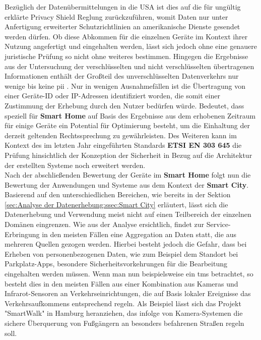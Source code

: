 Bezüglich der Datenübermittelungen in die USA ist dies auf die für ungültig erklärte Privacy Shield Reglung \cite{dsgvo2016} zurückzuführen, womit Daten nur unter Anfertigung erweiterter Schutzrichtlinien an amerikanische Dienste gesendet werden dürfen. Ob diese Abkommen für die einzelnen Geräte im Kontext ihrer Nutzung angefertigt und eingehalten werden, lässt sich jedoch ohne eine genauere juristische Prüfung so nicht ohne weiteres bestimmen. Hingegen die Ergebnisse aus der Untersuchung der verschlüsselten und nicht verschlüsselten übertragenen Informationen enthält der Großteil des unverschlüsselten Datenverkehrs nur wenige bis keine \ac{pii} \cite{Ren2019}. Nur in wenigen Ausnahmefällen ist die Übertragung von einer Geräte-ID oder IP-Adressen identifiziert worden, die somit einer Zustimmung der Erhebung durch den Nutzer bedürfen würde.
Bedeutet, dass speziell für \textbf{Smart Home} auf Basis des Ergebnisse aus dem erhobenen Zeitraum für einige Geräte ein Potential für Optimierung besteht, um die Einhaltung der derzeit geltenden Rechtssprechung zu gewährleisten. 
Des Weiteren kann im Kontext des im letzten Jahr eingeführten Standards \textbf{ETSI EN 303 645} \cite{Cyber2020} die Prüfung hinsichtlich der Konzeption der Sicherheit in Bezug auf die Architektur der erstellten Systeme noch erweitert werden.\\
Nach der abschließenden Bewertung der Geräte im \textbf{Smart Home} folgt nun die Bewertung der Anwendungen und Systeme aus dem Kontext der \textbf{Smart City}. Basierend auf den unterschiedlichen Bereichen, wie bereits in der Sektion \ref{sec:Analyse der Datenerhebung:ssec:Smart City} erläutert, lässt sich die Datenerhebung und Verwendung meist nicht auf einen Teilbereich der einzelnen Domänen eingrenzen.
Wie aus der Analyse \cite{BCG2020} ersichtlich, findet zur Service-Erbringung in den meisten Fällen eine Aggregation an Daten statt, die aus mehreren Quellen gezogen werden. Hierbei besteht jedoch die Gefahr, dass bei Erheben von personenbezogenen Daten, wie zum Beispiel dem Standort bei Parkplatz-Apps, besondere Sicherheitsvorkehrungen für die Bearbeitung eingehalten werden müssen. Wenn man nun beispielsweise ein \ac{tms} betrachtet, so besteht dies in den meisten Fällen aus einer Kombination aus Kameras und Infrarot-Sensoren an Verkehrseinrichtungen, die auf Basis lokaler Ereignisse das Verkehrsaufkommens entsprechend regeln. Als Beispiel lässt sich das Projekt "SmartWalk" \cite{SmartWalk2022} in Hamburg heranziehen, das infolge von Kamera-Systemen die sichere Überquerung von Fußgängern an besonders befahrenen Straßen regeln soll.
